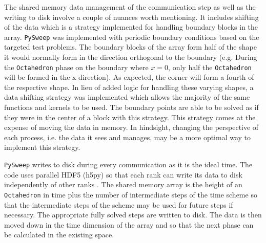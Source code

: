 \documentclass[preprints,article,accept,moreauthors,pdftex]{Definitions/mdpi}
\def\pysweep{\texttt{PySweep}}
\def\Oct{\texttt{Octahedron}}
\begin{document}
\par The shared memory data management of the communication step as well as the writing to disk involve a couple of nuances worth mentioning. It includes shifting of the data which is a strategy implemented for handling boundary blocks in the array. \pysweep{} was implemented with periodic boundary conditions based on the targeted test problems. The boundary blocks of the array form half of the shape it would normally form in the direction orthogonal to the boundary (e.g. During the \Oct{} phase on the boundary where $x=0$, only half the \Oct{} will be formed in the x direction). As expected, the corner will form a fourth of the respective shape. In lieu of added logic for handling these varying shapes, a data shifting strategy was implemented which allows the majority of the same functions and kernels to be used. The boundary points are able to be solved as if they were in the center of a block with this strategy. This strategy comes at the expense of moving the data in memory. In hindsight, changing the perspective of each process, i.e. the data it sees and manages, may be a more optimal way to implement this strategy.

\par \pysweep{} writes to disk during every communication as it is the ideal time. The code uses parallel HDF5 (h5py) so that each rank can write its data to disk independently of other ranks \cite{Collette2008HDF5Python}. The shared memory array is the height of an \Oct{} in time plus the number of intermediate steps of the time scheme so that the intermediate steps of the scheme may be used for future steps if necessary. The appropriate fully solved steps are written to disk. The data is then moved down in the time dimension of the array and so that the next phase can be calculated in the existing space.
\end{document}
